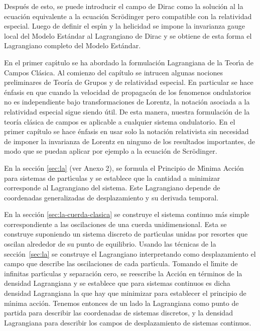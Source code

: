 Despu\'es de esto, se puede introducir el campo de Dirac como la soluci\'on al la ecuaci\'on equivalente a la ecuaci\'on Scr\"odinger pero compatible con la relatividad especial. Luego de definir el esp\'\i n y la helicidad se impone la invarianza gauge local del Modelo Est\'andar al Lagrangiano de Dirac y se obtiene de esta forma el Lagrangiano completo del Modelo Est\'andar.


En el primer cap\'\i tulo se ha abordado la formulaci\'on Lagrangiana de la Teor\'\i a de Campos Cl\'asica.
Al comienzo del capítulo se intrucen algunas nociones preliminares de Teoría de Grupos y de relatividad especial. En particular se hace énfasis en que cuando la velocidad de propagacón de los fenomenos ondulatorios no es independiente bajo transformaciones de Lorentz, la notación asociada a la relatividad especial sigue siendo útil. De esta manera, nuestra formulación de la teoría clásica de campos es aplicable a cualquier sistema ondulatorio. En el primer capítulo se hace énfasis en usar solo la notación relativista sin necesidad de imponer la invarianza de Lorentz en ninguno de los resultados importantes, de modo que se puedan aplicar por ejemplo a la ecuación de Scrödinger. 

En la secci\'on \ref{sec:la} (ver Anexo 2), se formula el Principio de M\'\i nima Acci\'on para sistemas de part\'\i culas y se establece que la cantidad a minimizar corresponde al Lagrangiano del sistema. Este Lagrangiano depende de coordenadas generalizadas de desplazamiento y su derivada temporal. 

En la secci\'on \ref{sec:la-cuerda-clasica} se construye el sistema continuo m\'as simple correspondiente a las oscilaciones de una cuerda unidimensional. Esta se construye suponiendo un sistema discreto de part\'\i culas unidas por resortes que oscilan alrededor de su punto de equilibrio. Usando las t\'ecnicas de la secci\'on~\ref{sec:la} se construye el Lagrangiano interpretando como desplazamiento el campo que describe las oscilaciones de cada part\'\i cula. Tomando el l\'\i mite de infinitas part\'\i culas y separaci\'on cero, se reescribe la Acci\'on en t\'erminos de la densidad Lagrangiana y se establece que para sistemas continuos es dicha densidad Lagrangiana la que hay que minimizar para establecer el principio de m\'\i nima acci\'on. Tenemos entonces de un lado la Lagrangiana como punto de partida para describir las coordenadas de sistemas discretos, y la densidad Lagrangiana para describir los campos de desplazamiento de sistemas continuos. 

